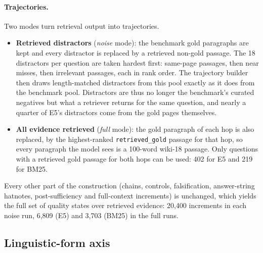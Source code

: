 \paragraph{Trajectories.} Two modes turn retrieval output into trajectories.
\begin{itemize}
  \item \textbf{Retrieved distractors} (\emph{noise} mode): the benchmark gold paragraphs are kept and every distractor is replaced by a retrieved non-gold passage. The 18 distractors per question are taken hardest first: same-page passages, then near misses, then irrelevant passages, each in rank order. The trajectory builder then draws length-matched distractors from this pool exactly as it does from the benchmark pool. Distractors are thus no longer the benchmark's curated negatives but what a retriever returns for the same question, and nearly a quarter of E5's distractors come from the gold pages themselves.
  \item \textbf{All evidence retrieved} (\emph{full} mode): the gold paragraph of each hop is also replaced, by the highest-ranked \texttt{retrieved\_gold} passage for that hop, so every paragraph the model sees is a 100-word wiki-18 passage. Only questions with a retrieved gold passage for both hops can be used: 402 for E5 and 219 for BM25.
\end{itemize}
Every other part of the construction (chains, controls, falsification, answer-string hatnotes, post-sufficiency and full-context increments) is unchanged, which yields the full set of quality states over retrieved evidence: 20{,}400 increments in each noise run, 6{,}809 (E5) and 3{,}703 (BM25) in the full runs.

\subsection{Linguistic-form axis}
\label{app:estb-form}

